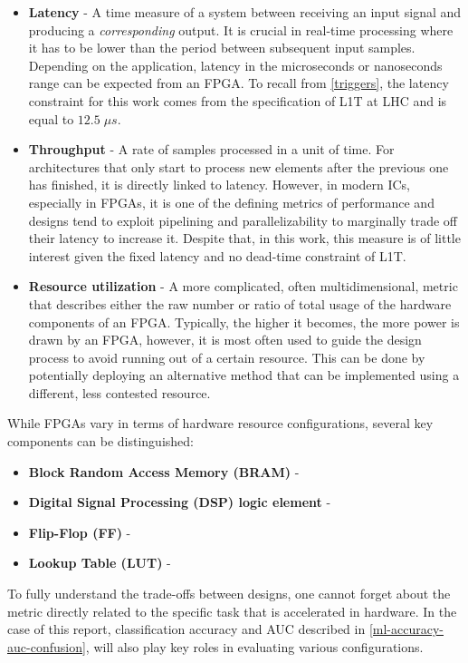\begin{itemize}
  \item \textbf{Latency} - A time measure of a system between receiving an input signal and producing a \textit{corresponding} output. It is crucial in real-time processing where it has to be lower than the period between subsequent input samples. Depending on the application, latency in the microseconds or nanoseconds range can be expected from an FPGA. To recall from \cref{triggers}, the latency constraint for this work comes from the specification of L1T at LHC and is equal to \(12.5\; \mu s\).
  \item \textbf{Throughput} - A rate of samples processed in a unit of time. For architectures that only start to process new elements after the previous one has finished, it is directly linked to latency. However, in modern ICs, especially in FPGAs, it is one of the defining metrics of performance and designs tend to exploit pipelining and parallelizability to marginally trade off their latency to increase it. Despite that, in this work, this measure is of little interest given the fixed latency and no dead-time constraint of L1T.
  \item \textbf{Resource utilization} - A more complicated, often multidimensional, metric that describes either the raw number or ratio of total usage of the hardware components of an FPGA. Typically, the higher it becomes, the more power is drawn by an FPGA, however, it is most often used to guide the design process to avoid running out of a certain resource. This can be done by potentially deploying an alternative method that can be implemented using a different, less contested resource. 
\end{itemize}

While FPGAs vary in terms of hardware resource configurations, several key components can be distinguished:

\begin{itemize}
  \item \textbf{Block Random Access Memory (BRAM)} - 
  \item \textbf{Digital Signal Processing (DSP) logic element} - 
  \item \textbf{Flip-Flop (FF)} - 
  \item \textbf{Lookup Table (LUT)} - 
\end{itemize}

To fully understand the trade-offs between designs, one cannot forget about the metric directly related to the specific task that is accelerated in hardware. In the case of this report, classification accuracy and AUC described in \cref{ml-accuracy-auc-confusion}, will also play key roles in evaluating various configurations.


